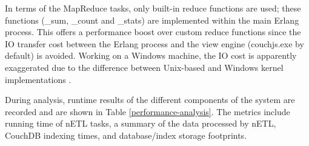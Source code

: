 In terms of the MapReduce tasks, only built-in reduce functions are used; these functions (\_sum, \_count and \_stats) are implemented within the main Erlang process. This offers a performance boost over custom reduce functions since the IO transfer cost between the Erlang process and the view engine (couchjs.exe by default) is avoided. Working on a Windows machine, the IO cost is apparently exaggerated due to the difference between Unix-based and Windows kernel implementations \cite{slack1Nov}.

During analysis, runtime results of the different components of the system are recorded and are shown in Table \ref{performance-analysis}. The metrics include running time of nETL tasks, a summary of the data processed by nETL, CouchDB indexing times, and database/index storage footprints.